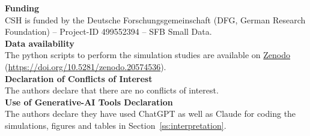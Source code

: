 \documentclass{imsart}
\theoremstyle{plain}
\theoremstyle{definition}
\begin{document}
\bigskip

\noindent
\textbf{Funding} \\
\noindent
CSH is funded by the Deutsche Forschungsgemeinschaft (DFG, German Research Foundation) – Project-ID 499552394 – SFB Small Data. \\ 
\noindent
\textbf{Data availability} \\
\noindent
The python scripts to perform the simulation studies are available on \href{https://doi.org/10.5281/zenodo.20574536}{Zenodo} (\url{https://doi.org/10.5281/zenodo.20574536}).\\
\noindent
\textbf{Declaration of Conflicts of Interest} \\
The authors declare that there are no conflicts of interest.
\\
\textbf{Use of Generative-AI Tools Declaration} \\
The authors declare they have used ChatGPT as well as Claude for coding the simulations,  figures and tables in Section~\ref{ss:interpretation}.






%

\end{document}

